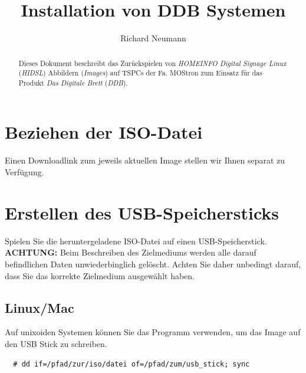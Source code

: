 \documentclass[a4paper,11pt,authoryear]{article}
\title{Installation von DDB Systemen}
\author[1]{Richard Neumann}
\affil[1]{HOMEINFO - Digitale Informationssysteme GmbH}
\begin{document}
\maketitle
\tableofcontents

\begin{abstract}
Dieses Dokument beschreibt das Zurückspielen von \emph{HOMEINFO Digital Signage Linux} (\emph{HIDSL}) Abbildern (\emph{Images}) auf TSPCs der Fa. MOStron zum Einsatz für das Produkt \emph{Das Digitale Brett} (\emph{DDB}).
\end{abstract}

\pagebreak

\section{Beziehen der ISO-Datei}
Einen Downloadlink zum jeweils aktuellen Image stellen wir Ihnen separat zu Verfügung.

\section{Erstellen des USB-Speichersticks}
Spielen Sie die heruntergeladene ISO-Datei auf einen USB-Speicherstick.
\textbf{ACHTUNG:} Beim Beschreiben des Zielmediums werden alle darauf befindlichen Daten unwiederbinglich gelöscht. Achten Sie daher unbedingt darauf, dass Sie das korrekte Zielmedium ausgewählt haben.
\subsection{Linux/Mac}
Auf unixoiden Systemen können Sie das Programm  verwenden, um das Image auf den USB Stick zu schreiben.
\begin{verbatim}
  # dd if=/pfad/zur/iso/datei of=/pfad/zum/usb_stick; sync
\end{verbatim}
\end{document}
